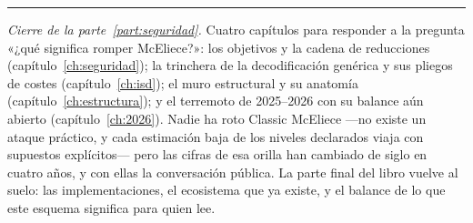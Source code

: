 \begin{center}\rule{0.55\textwidth}{0.4pt}\end{center}
\medskip
\noindent\textit{Cierre de la parte~\ref{part:seguridad}.} Cuatro
capítulos para responder a la pregunta «¿qué significa romper
McEliece?»: los objetivos y la cadena de reducciones
(capítulo~\ref{ch:seguridad}); la trinchera de la decodificación
genérica y sus pliegos de costes (capítulo~\ref{ch:isd}); el muro
estructural y su anatomía (capítulo~\ref{ch:estructura}); y el
terremoto de 2025--2026 con su balance aún abierto
(capítulo~\ref{ch:2026}). Nadie ha roto Classic McEliece ---no
existe un ataque práctico, y cada estimación baja de los niveles
declarados viaja con supuestos explícitos--- pero las cifras de esa
orilla han cambiado de siglo en cuatro años, y con ellas la
conversación pública. La parte final del libro vuelve al suelo: las
implementaciones, el ecosistema que ya existe, y el balance de lo
que este esquema significa para quien lee.
